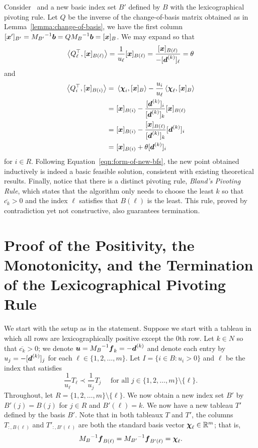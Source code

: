 Consider \LPSA~and a new basic index set $B'$ defined by $B$ with the lexicographical pivoting rule. Let $Q$ be the inverse of the change-of-basis matrix obtained as in Lemma~\ref{lemma:change-of-basis}, we have the first column $[{\boldsymbol x}']_{B'} = {M_{B'}}^{-1}{\boldsymbol b} = Q {M_{B}}^{-1} {\boldsymbol b} = [{\boldsymbol x}]_B$. We may expand so that 
\[ \left\langle Q_\ell^\top, [{\boldsymbol x}]_{B(\ell)}\right\rangle = \frac{1}{u_\ell} [{\boldsymbol x}]_{B(\ell)} = \frac{[{\boldsymbol x}]_{B(\ell)}}{-[{\boldsymbol d}^{(k)}]_\ell} = \theta\] and 
\[ \begin{split}
\left\langle Q_i^\top, [{\boldsymbol x}]_{B(i)}\right\rangle  =~& \left\langle\boldsymbol\chi_i, [{\boldsymbol x}]_B\right\rangle - \frac{u_i}{u_\ell} \left\langle\boldsymbol\chi_\ell, [{\boldsymbol x}]_B\right\rangle\\
=~& [{\boldsymbol x}]_{B(i)} - \frac{[{\boldsymbol d}^{(k)}]_{i}}{[{\boldsymbol d}^{(k)}]_k}[{\boldsymbol x}]_{B(\ell)} \\
=~& [{\boldsymbol x}]_{B(i)} - \frac{ [{\boldsymbol x}]_{B(\ell) }}{[{\boldsymbol d}^{(k)}]_k}[{\boldsymbol d}^{(k)}]_{i} \\
=~& [{\boldsymbol x}]_{B(i)} + \theta [{\boldsymbol d}^{(k)}]_{i}  
\end{split} \]  for $i\in R$. Following Equation~\ref{eqn:form-of-new-bfs}, the new point obtained inductively is indeed a basic feasible solution, consistent with existing theoretical results. Finally, notice that there is a distinct pivoting rule, {\em Bland's Pivoting Rule}, which states that the algorithm only needs to choose the least $k$ so that $\overline{c_k} > 0$ and the index $\ell$ satisfies that $B(\ell)$ is the least. This rule, proved by contradiction yet not constructive, also guarantees termination. 


\section{Proof of the Positivity, the Monotonicity, and the Termination of the Lexicographical Pivoting Rule}

We start with the setup as in the statement. Suppose we start with a tableau in which all rows are lexicographically positive except the 0th row. Let $k\in N$ so that $\overline{c_k} > 0 $; we denote ${\boldsymbol u} = {M_B}^{-1}{\boldsymbol f}_{k} = -{\boldsymbol d}^{(k)} $ and denote each entry by $u_j = -[{\boldsymbol d}^{(k)}]_j$ for each $\ell \in \{1, 2, \dots, m\}$. Let $I = \{i \in B: u_i > 0\}$ and $\ell$ be the index that satisfies 
\[ \frac{1}{ u_{\ell}} T_\ell \prec \frac{1}{ u_j } T_j \quad\text{ for all $j \in \{1, 2, \dots, m\} \setminus \{\ell\}$}. \] 
Throughout, let $R = \{1, 2, \dots, m\} \setminus \{ \ell \}$. 
We now obtain a new index set $B'$ by $B'(j) = B(j)$ for $j \in R$ and $B'(\ell) = k$. We now have a new tableau $T'$ defined by the basis $B'$. Note that in both tableaux $T$ and $T'$, the columns $T_{:, B(\ell)}$ and $T'_{:, B'(\ell)}$ are both the standard basis vector $\boldsymbol\chi_\ell\in\mathbb R^m$; that is, \[{M_{B}}^{-1} {\boldsymbol f}_{B(\ell)} = {M_{B'}}^{-1} {\boldsymbol f}_{B'(\ell)} = \boldsymbol\chi_\ell.\] 


